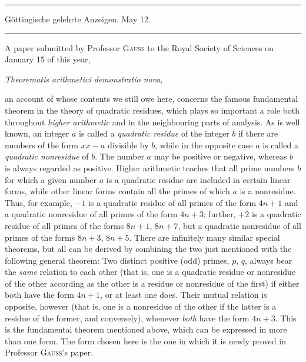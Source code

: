 \clearpage{}%
\thispagestyle{empty}
\begin{center}
\vspace*{1in}{\Large REVIEWS\par}
\vspace{.4in}{\large OF HIS OWN\par}
\vspace{.4in}{\Large WRITINGS.\par}
\end{center}

\clearpage{}%
\renewcommand{\BookRunningTitle}{Reviews of His Own Writings}
\begin{center}
\rule{.86\linewidth}{.3pt}\par
Göttingische gelehrte Anzeigen. May 12.\par
\rule{.86\linewidth}{.3pt}
\end{center}

A paper submitted by Professor \textsc{Gauss} to the Royal Society of Sciences on January 15 of this year,
\begin{center}\emph{Theorematis arithmetici demonstratio nova},\end{center}
an account of whose contents we still owe here, concerns the famous fundamental theorem in the theory of quadratic residues, which plays so important a role both throughout \emph{higher arithmetic} and in the neighbouring parts of analysis. As is well known, an integer $a$ is called a \emph{quadratic residue} of the integer $b$ if there are numbers of the form $xx-a$ divisible by $b$, while in the opposite case $a$ is called a \emph{quadratic nonresidue} of $b$. The number $a$ may be positive or negative, whereas $b$ is always regarded as positive. Higher arithmetic teaches that all prime numbers $b$ for which a given number $a$ is a quadratic residue are included in certain linear forms, while other linear forms contain all the primes of which $a$ is a nonresidue. Thus, for example, $-1$ is a quadratic residue of all primes of the form $4n+1$ and a quadratic nonresidue of all primes of the form $4n+3$; further, $+2$ is a quadratic residue of all primes of the forms $8n+1$, $8n+7$, but a quadratic nonresidue of all primes of the forms $8n+3$, $8n+5$. There are infinitely many similar special theorems, but all can be derived by combining the two just mentioned
%
with the following general theorem: Two distinct positive (odd) primes, $p$, $q$, always bear the \emph{same} relation to each other (that is, one is a quadratic residue or nonresidue of the other according as the other is a residue or nonresidue of the first) if either both have the form $4n+1$, or at least one does. Their mutual relation is opposite, however (that is, one is a nonresidue of the other if the latter is a residue of the former, and conversely), whenever \emph{both} have the form $4n+3$. This is the fundamental theorem mentioned above, which can be expressed in more than one form. The form chosen here is the one in which it is newly proved in Professor \textsc{Gauss}'s paper.


